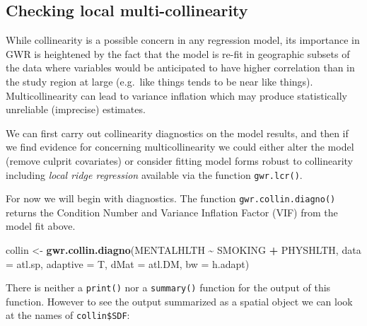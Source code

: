 \documentclass[
]{book}
\newenvironment{Shaded}{\begin{snugshade}}{\end{snugshade}}
\newcommand{\AttributeTok}[1]{\textcolor[rgb]{0.13,0.29,0.53}{#1}}
\newcommand{\FunctionTok}[1]{\textcolor[rgb]{0.13,0.29,0.53}{\textbf{#1}}}
\newcommand{\NormalTok}[1]{#1}
\newcommand{\OtherTok}[1]{\textcolor[rgb]{0.56,0.35,0.01}{#1}}
\newcommand{\SpecialCharTok}[1]{\textcolor[rgb]{0.81,0.36,0.00}{\textbf{#1}}}
\begin{document}
\hypertarget{checking-local-multi-collinearity}{%
\subsection{Checking local multi-collinearity}\label{checking-local-multi-collinearity}}

While collinearity is a possible concern in any regression model, its importance in GWR is heightened by the fact that the model is re-fit in geographic subsets of the data where variables would be anticipated to have higher correlation than in the study region at large (e.g.~like things tends to be near like things). Multicollinearity can lead to variance inflation which may produce statistically unreliable (imprecise) estimates.

We can first carry out collinearity diagnostics on the model results, and then if we find evidence for concerning multicollinearity we could either alter the model (remove culprit covariates) or consider fitting model forms robust to collinearity including \emph{local ridge regression} available via the function \texttt{gwr.lcr()}.

For now we will begin with diagnostics. The function \texttt{gwr.collin.diagno()} returns the Condition Number and Variance Inflation Factor (VIF) from the model fit above.

\begin{Shaded}
\begin{Highlighting}[]
\NormalTok{collin }\OtherTok{\textless{}{-}} \FunctionTok{gwr.collin.diagno}\NormalTok{(MENTALHLTH }\SpecialCharTok{\textasciitilde{}}\NormalTok{ SMOKING }\SpecialCharTok{+}\NormalTok{ PHYSHLTH,}
                            \AttributeTok{data =}\NormalTok{ atl.sp,}
                            \AttributeTok{adaptive =}\NormalTok{ T,}
                            \AttributeTok{dMat =}\NormalTok{ atl.DM,}
                            \AttributeTok{bw =}\NormalTok{ h.adapt)}
\end{Highlighting}
\end{Shaded}

There is neither a \texttt{print()} nor a \texttt{summary()} function for the output of this function. However to see the output summarized as a spatial object we can look at the names of \texttt{collin\$SDF}:

\begin{Shaded}
\end{Shaded}
\end{document}
